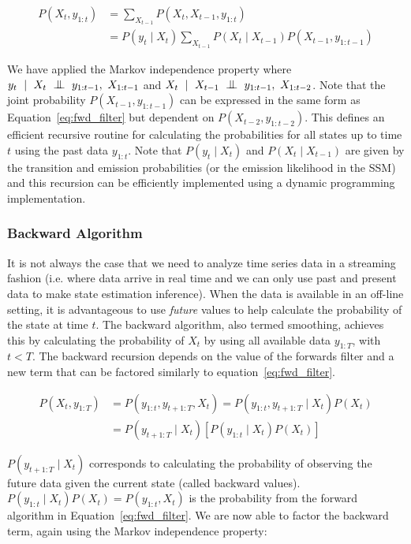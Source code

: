 \begin{equation}\label{eq:fwd_filter}
  \begin{split}
    P(X_t, y_{1:t}) &= \sum_{X_{t-1}} P(X_t, X_{t-1}, y_{1:t}) \\&= P(y_{t} \mid X_t) \sum_{X_{t-1}} P(X_t \mid X_{t-1})P(X_{t-1}, y_{1:t-1})
  \end{split}
\end{equation}

We have applied the Markov independence property where $y_{t}~\mid~X_t~\indep~y_{1:t-1},~X_{1:t-1}$ and $X_{t}~\mid~X_{t-1}~\indep~y_{1:t-1},~X_{1:t-2}$. Note that the joint probability $P(X_{t-1}, y_{1:t-1})$ can be expressed in the same form as Equation~\ref{eq:fwd_filter} but dependent on $P(X_{t-2}, y_{1:t-2})$. This defines an efficient recursive routine for calculating the probabilities for all states up to time $t$ using the past data $y_{1:t}$. Note that $P(y_{t} \mid X_t)$ and $P(X_t \mid X_{t-1})$ are given by the transition and emission probabilities (or the emission likelihood in the SSM) and this recursion can be efficiently implemented using a dynamic programming implementation.

\subsubsection{Backward Algorithm}
It is not always the case that we need to analyze time series data in a streaming fashion (i.e. where data arrive in real time and we can only use past and present data to make state estimation inference). When the data is available in an off-line setting, it is advantageous to use \textit{future} values to help calculate the probability of the state at time $t$. The backward algorithm, also termed smoothing, achieves this by calculating the probability of $X_t$ by using all available data $y_{1:T}$, with $t < T$. The backward recursion depends on the value of the forwards filter and a new term that can be factored similarly to equation~\ref{eq:fwd_filter}.

\begin{equation}\label{eq:bkwd_filter1}
  \begin{split}
    P(X_t, y_{1:T}) &= P(y_{1:t}, y_{t+1:T}, X_t) =  P(y_{1:t}, y_{t+1:T} \mid X_t)P(X_t)\\ &= P(y_{t+1:T} \mid X_t)[P(y_{1:t} \mid X_t)P(X_t)]
  \end{split}
\end{equation}

$P(y_{t+1:T} \mid X_t)$ corresponds to calculating the probability of observing the future data given the current state (called backward values). $P(y_{1:t} \mid X_t)P(X_t) = P(y_{1:t}, X_t)$ is the probability from the forward algorithm in Equation~\ref{eq:fwd_filter}. We are now able to factor the backward term, again using the Markov independence property:

